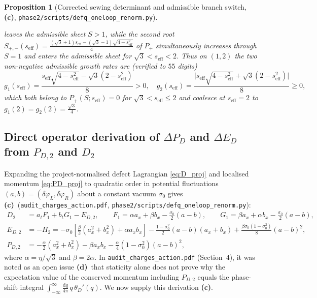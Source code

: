 \documentclass[11pt,a4paper]{article}
\newcommand{\Lc}{\textsf{\textbf{(c)}}}
\newcommand{\Ld}{\textsf{\textbf{(d)}}}
\newcommand{\dd}{\mathrm{d}}
\newcommand{\sren}{\texttt{phase2/\allowbreak scripts/\allowbreak defq\_\allowbreak oneloop\_\allowbreak renorm.py}}
\newtheorem{proposition}{Proposition}[section]
\theoremstyle{remark}
\begin{document}
\begin{proposition}[Corrected sewing determinant and admissible branch switch, \Lc, \sren]
\begin{enumerate}
\begin{itemize}
leaves the admissible sheet $S>1$, while the second root
$S_{+,-}(s_{\mathrm{eff}}) = \frac{(\sqrt{3}+1)s_{\mathrm{eff}}-(\sqrt{3}-1)\sqrt{4-s_{\mathrm{eff}}^2}}{4}$
of $P_+$ simultaneously increases through $S=1$ and enters the admissible sheet
for $\sqrt{3} < s_{\mathrm{eff}} < 2$. Thus on $(1,2)$ the two non-negative
admissible growth rates are (verified to $55$ digits)
\begin{equation}\label{eq:g_admissible}
  g_1(s_{\mathrm{eff}}) = \frac{s_{\mathrm{eff}}\sqrt{4-s_{\mathrm{eff}}^2} - \sqrt{3}(2-s_{\mathrm{eff}}^2)}{8} > 0, \quad
  g_2(s_{\mathrm{eff}}) = \frac{\big|s_{\mathrm{eff}}\sqrt{4-s_{\mathrm{eff}}^2} + \sqrt{3}(2-s_{\mathrm{eff}}^2)\big|}{8} \ge 0,
\end{equation}
which both belong to $P_+(S;s_{\mathrm{eff}})=0$ for $\sqrt{3}<s_{\mathrm{eff}}\le 2$
and coalesce at $s_{\mathrm{eff}}=2$ to $g_1(2)=g_2(2)=\frac{\sqrt{3}}{4}$.
\end{itemize}
\end{enumerate}
\end{proposition}

\subsection{Direct operator derivation of \texorpdfstring{$\Delta P_D$ and $\Delta E_D$ from $P_{D,2}$ and $D_2$}{Delta P\_D and Delta E\_D from P\_{D,2} and D\_2}}

Expanding the project-normalised defect Lagrangian \eqref{eq:D_proj} and
localised momentum \eqref{eq:PD_proj} to quadratic order in potential
fluctuations $(a,b) = (\delta\varphi_L,\delta\varphi_R)$ about a constant vacuum
$\sigma_0$ gives \Lc\ (\texttt{audit\_charges\_action.pdf}, \sren):
\begin{align}
  D_2 &= a_t F_1 + b_t G_1 - E_{D,2}, \qquad
  F_1 = \alpha a_x + \beta b_x - \frac{\sigma_0}{2}(a-b), \qquad
  G_1 = \beta a_x + \alpha b_x - \frac{\sigma_0}{2}(a-b), \label{eq:D2_F1G1}\\
  E_{D,2} &= -H_2 = -\sigma_0\!\left[\frac{\beta}{2}(a_x^2+b_x^2) + \alpha a_x b_x\right]
  - \frac{1-\sigma_0^2}{2}(a-b)(a_x+b_x) + \frac{\beta\sigma_0(1-\sigma_0^2)}{8}(a-b)^2, \label{eq:ED2}\\
  P_{D,2} &= -\frac{\alpha}{2}(a_x^2+b_x^2) - \beta a_x b_x - \frac{\alpha}{4}(1-\sigma_0^2)(a-b)^2, \label{eq:PD2}
\end{align}
where $\alpha = \eta/\sqrt{3}$ and $\beta = 2\alpha$. In
\texttt{audit\_charges\_action.pdf} (Section~4), it was noted as an open issue
\Ld\ that staticity alone does not prove why the expectation value of the
conserved momentum including $P_{D,2}$ equals the phase-shift integral
$\int_{-\infty}^\infty \frac{\dd q}{4\pi}\,q\,\theta_D'(q)$. We now supply this
derivation \Lc.
\end{document}
